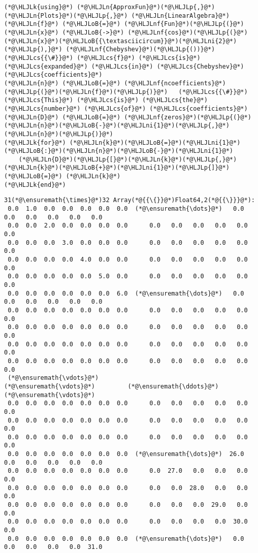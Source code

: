 \documentclass[12pt,landscape]{article}
\newcommand{\HLJLk}[1]{\textcolor[RGB]{148,91,176}{\textbf{#1}}}
\newcommand{\HLJLn}[1]{#1}
\newcommand{\HLJLnf}[1]{\textcolor[RGB]{66,102,213}{#1}}
\newcommand{\HLJLni}[1]{\textcolor[RGB]{59,151,46}{#1}}
\newcommand{\HLJLoB}[1]{\textcolor[RGB]{102,102,102}{\textbf{#1}}}
\newcommand{\HLJLp}[1]{#1}
\newcommand{\HLJLcs}[1]{\textcolor[RGB]{153,153,119}{\textit{#1}}}
\begin{document}
{\begin{lstlisting}
(*@\HLJLk{using}@*) (*@\HLJLn{ApproxFun}@*)(*@\HLJLp{,}@*) (*@\HLJLn{Plots}@*)(*@\HLJLp{,}@*) (*@\HLJLn{LinearAlgebra}@*)
(*@\HLJLn{f}@*) (*@\HLJLoB{=}@*) (*@\HLJLnf{Fun}@*)(*@\HLJLp{(}@*)(*@\HLJLn{x}@*) (*@\HLJLoB{->}@*) (*@\HLJLnf{cos}@*)(*@\HLJLp{(}@*)(*@\HLJLn{x}@*)(*@\HLJLoB{{\textasciicircum}}@*)(*@\HLJLni{2}@*)(*@\HLJLp{),}@*) (*@\HLJLnf{Chebyshev}@*)(*@\HLJLp{())}@*)   (*@\HLJLcs{{\#}}@*) (*@\HLJLcs{f}@*) (*@\HLJLcs{is}@*) (*@\HLJLcs{expanded}@*) (*@\HLJLcs{in}@*) (*@\HLJLcs{Chebyshev}@*) (*@\HLJLcs{coefficients}@*)
(*@\HLJLn{n}@*) (*@\HLJLoB{=}@*) (*@\HLJLnf{ncoefficients}@*)(*@\HLJLp{(}@*)(*@\HLJLn{f}@*)(*@\HLJLp{)}@*)   (*@\HLJLcs{{\#}}@*) (*@\HLJLcs{This}@*) (*@\HLJLcs{is}@*) (*@\HLJLcs{the}@*) (*@\HLJLcs{number}@*) (*@\HLJLcs{of}@*) (*@\HLJLcs{coefficients}@*)
(*@\HLJLn{D}@*) (*@\HLJLoB{=}@*) (*@\HLJLnf{zeros}@*)(*@\HLJLp{(}@*)(*@\HLJLn{n}@*)(*@\HLJLoB{-}@*)(*@\HLJLni{1}@*)(*@\HLJLp{,}@*)(*@\HLJLn{n}@*)(*@\HLJLp{)}@*)
(*@\HLJLk{for}@*) (*@\HLJLn{k}@*)(*@\HLJLoB{=}@*)(*@\HLJLni{1}@*)(*@\HLJLoB{:}@*)(*@\HLJLn{n}@*)(*@\HLJLoB{-}@*)(*@\HLJLni{1}@*)
    (*@\HLJLn{D}@*)(*@\HLJLp{[}@*)(*@\HLJLn{k}@*)(*@\HLJLp{,}@*)(*@\HLJLn{k}@*)(*@\HLJLoB{+}@*)(*@\HLJLni{1}@*)(*@\HLJLp{]}@*) (*@\HLJLoB{=}@*) (*@\HLJLn{k}@*)
(*@\HLJLk{end}@*)
\end{lstlisting}
{\normalsize
\begin{lstlisting}
31(*@\ensuremath{\times}@*)32 Array(*@{{\{}}@*)Float64,2(*@{{\}}}@*):
 0.0  1.0  0.0  0.0  0.0  0.0  0.0  (*@\ensuremath{\dots}@*)   0.0   0.0   0.0   0.0   0.0   0.0
 0.0  0.0  2.0  0.0  0.0  0.0  0.0      0.0   0.0   0.0   0.0   0.0   0.0
 0.0  0.0  0.0  3.0  0.0  0.0  0.0      0.0   0.0   0.0   0.0   0.0   0.0
 0.0  0.0  0.0  0.0  4.0  0.0  0.0      0.0   0.0   0.0   0.0   0.0   0.0
 0.0  0.0  0.0  0.0  0.0  5.0  0.0      0.0   0.0   0.0   0.0   0.0   0.0
 0.0  0.0  0.0  0.0  0.0  0.0  6.0  (*@\ensuremath{\dots}@*)   0.0   0.0   0.0   0.0   0.0   0.0
 0.0  0.0  0.0  0.0  0.0  0.0  0.0      0.0   0.0   0.0   0.0   0.0   0.0
 0.0  0.0  0.0  0.0  0.0  0.0  0.0      0.0   0.0   0.0   0.0   0.0   0.0
 0.0  0.0  0.0  0.0  0.0  0.0  0.0      0.0   0.0   0.0   0.0   0.0   0.0
 0.0  0.0  0.0  0.0  0.0  0.0  0.0      0.0   0.0   0.0   0.0   0.0   0.0
 (*@\ensuremath{\vdots}@*)                        (*@\ensuremath{\vdots}@*)         (*@\ensuremath{\ddots}@*)                           (*@\ensuremath{\vdots}@*)        
 0.0  0.0  0.0  0.0  0.0  0.0  0.0      0.0   0.0   0.0   0.0   0.0   0.0
 0.0  0.0  0.0  0.0  0.0  0.0  0.0      0.0   0.0   0.0   0.0   0.0   0.0
 0.0  0.0  0.0  0.0  0.0  0.0  0.0      0.0   0.0   0.0   0.0   0.0   0.0
 0.0  0.0  0.0  0.0  0.0  0.0  0.0  (*@\ensuremath{\dots}@*)  26.0   0.0   0.0   0.0   0.0   0.0
 0.0  0.0  0.0  0.0  0.0  0.0  0.0      0.0  27.0   0.0   0.0   0.0   0.0
 0.0  0.0  0.0  0.0  0.0  0.0  0.0      0.0   0.0  28.0   0.0   0.0   0.0
 0.0  0.0  0.0  0.0  0.0  0.0  0.0      0.0   0.0   0.0  29.0   0.0   0.0
 0.0  0.0  0.0  0.0  0.0  0.0  0.0      0.0   0.0   0.0   0.0  30.0   0.0
 0.0  0.0  0.0  0.0  0.0  0.0  0.0  (*@\ensuremath{\dots}@*)   0.0   0.0   0.0   0.0   0.0  31.0
\end{lstlisting}}


}
\end{document}
